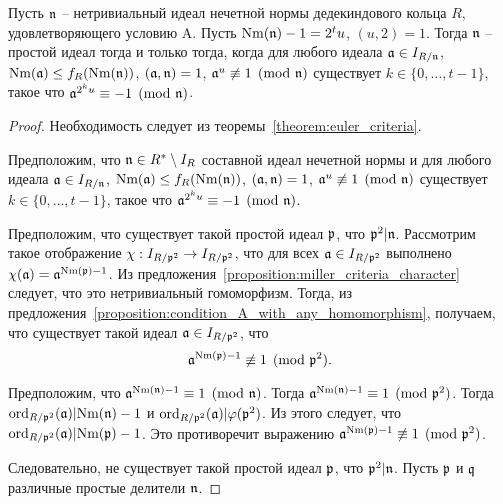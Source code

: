 \documentclass[_00_dissertation.tex]{subfiles}
\begin{document}
\begin{theorem}\label{theorem:miller_criteria_deterministic}
    Пусть $\mathfrak{n}$ -- нетривиальный идеал нечетной нормы дедекиндового кольца $R$, удовлетворяющего условию A.
    Пусть $\textrm{Nm}(\mathfrak{n}) - 1 = 2^t u$, $(u, 2) = 1$.
    Тогда $\mathfrak{n}$ -- простой идеал тогда и только тогда, когда для любого идеала $\mathfrak{a} \in I_{R/\mathfrak{n}}$, $\textrm{Nm}(\mathfrak{a}) \le f_R(\textrm{Nm}(\mathfrak{n}))$, $(\mathfrak{a}, \mathfrak{n}) = 1$, $\mathfrak{a}^u \not\equiv 1 \pmod{\mathfrak{n}}$ существует $k\in \{0, \dots, t-1\}$, такое что $\mathfrak{a}^{2^{k}u} \equiv -1 \pmod{\mathfrak{n}}$.
\end{theorem}
\begin{proof}
    Необходимость следует из теоремы~\ref{theorem:euler_criteria}.

    Предположим, что $\mathfrak{n} \in R^{*} \setminus I_{R}$ составной идеал нечетной нормы и для любого идеала $\mathfrak{a} \in I_{R/\mathfrak{n}}$, $\textrm{Nm}(\mathfrak{a}) \le f_R(\textrm{Nm}(\mathfrak{n}))$, $(\mathfrak{a}, \mathfrak{n}) = 1$, $\mathfrak{a}^u \not\equiv 1 \pmod{\mathfrak{n}}$ существует $k\in \{0, \dots, t-1\}$, такое что $\mathfrak{a}^{2^{k}u} \equiv -1 \pmod{\mathfrak{n}}$.

    Предположим, что существует такой простой идеал $\mathfrak{p}$, что $\mathfrak{p}^2 | \mathfrak{n}$.
    Рассмотрим такое отображение $\chi: I_{R/\mathfrak{p}^2} \to I_{R/\mathfrak{p}^2}$, что для всех $\mathfrak{a} \in I_{R/\mathfrak{p}^2}$ выполнено $\chi(\mathfrak{a}) = \mathfrak{a}^{\textrm{Nm}(\mathfrak{p}) - 1}$.
    Из предложения~\ref{proposition:miller_criteria_character} следует, что это нетривиальный гомоморфизм.
    Тогда, из предложения~\ref{proposition:condition_A_with_any_homomorphism}, получаем, что существует такой идеал $\mathfrak{a} \in I_{R/\mathfrak{p}^2}$, что
    \begin{equation*}
        \mathfrak{a}^{\textrm{Nm}(\mathfrak{p}) - 1} \not\equiv 1 \pmod{\mathfrak{p}^2}.
    \end{equation*}

    Предположим, что $\mathfrak{a}^{\textrm{Nm}(\mathfrak{n}) - 1} \equiv 1 \pmod{\mathfrak{n}}$.
    Тогда $\mathfrak{a}^{\textrm{Nm}(\mathfrak{n}) - 1} \equiv 1 \pmod{\mathfrak{p}^2}$.
    Тогда $\textrm{ord}_{R/\mathfrak{p}^2}(\mathfrak{a}) | \textrm{Nm}(\mathfrak{n}) - 1$ и $\textrm{ord}_{R/\mathfrak{p}^2}(\mathfrak{a}) | \varphi(\mathfrak{p}^2)$.
    Из этого следует, что $\textrm{ord}_{R/\mathfrak{p}^2}(\mathfrak{a}) | \textrm{Nm}(\mathfrak{p}) - 1$.
    Это противоречит выражению $\mathfrak{a}^{\textrm{Nm}(\mathfrak{p}) - 1} \not\equiv 1 \pmod{\mathfrak{p}^2}$.

    Следовательно, не существует такой простой идеал $\mathfrak{p}$, что $\mathfrak{p}^2 | \mathfrak{n}$.
    Пусть $\mathfrak{p}$ и $\mathfrak{q}$ различные простые делители $\mathfrak{n}$.
    

\end{proof}
\end{document}
